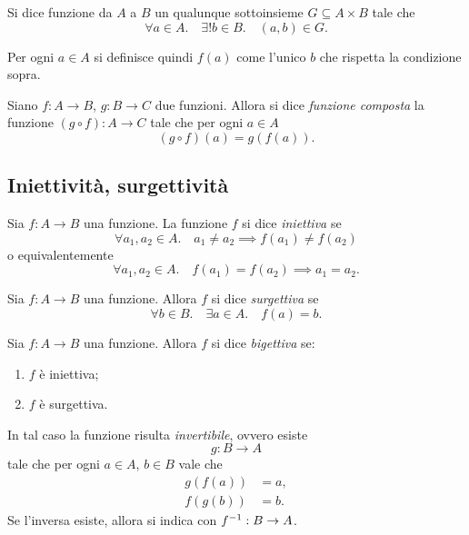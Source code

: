 \begin{definition}
    Si dice funzione da $A$ a $B$ un qualunque sottoinsieme $G \subseteq A \times B$ tale che \[
        \forall a \in A.\quad \exists! b \in B. \quad (a, b) \in G.    
    \]

    Per ogni $a \in A$ si definisce quindi $f(a)$ come l'unico $b$ che rispetta la condizione sopra.
\end{definition}

\begin{definition}
    Siano $f : A \to B$, $g : B \to C$ due funzioni. Allora si dice \emph{funzione composta} la funzione $(g \circ f) : A \to C$ tale che per ogni $a \in A$ \[
        (g \circ f)(a) = g(f(a)).    
    \]
\end{definition}

\subsection{Iniettività, surgettività}

\begin{definition}
    Sia $f : A \to B$ una funzione. La funzione $f$ si dice \emph{iniettiva} se \[
        \forall a_1, a_2 \in A. \quad a_1 \neq a_2 \implies f(a_1) \neq f(a_2)    
    \] o equivalentemente
    \[
        \forall a_1, a_2 \in A. \quad f(a_1) = f(a_2) \implies a_1 = a_2.  
    \]
\end{definition}

\begin{definition}
    Sia $f : A \to B$ una funzione. Allora $f$ si dice \emph{surgettiva} se \[
        \forall b \in B. \quad \exists a \in A. \quad f(a) = b.    
    \]
\end{definition}

\begin{definition}
    Sia $f : A \to B$ una funzione. Allora $f$ si dice \emph{bigettiva} se:
    \begin{enumerate}[label={(\roman*)}]
        \item $f$ è iniettiva;
        \item $f$ è surgettiva.
    \end{enumerate}

    In tal caso la funzione risulta \emph{invertibile}, ovvero esiste \[
        g : B \to A
    \] tale che per ogni $a \in A$, $b \in B$ vale che
    \begin{align*}
        g(f(a)) &= a, \\
        f(g(b)) &= b.
    \end{align*}
    Se l'inversa esiste, allora si indica con $f^{-1} : B \to A$.
\end{definition}

